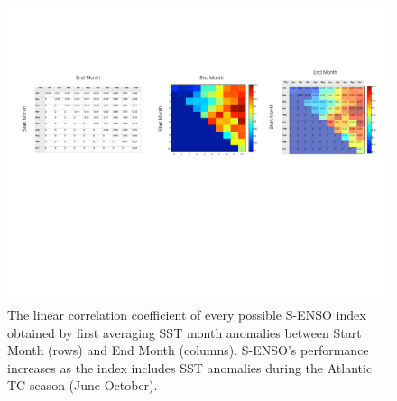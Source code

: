 
\begin{figure}[htbp]
	\centering
		\includegraphics[width=6in]{figures/monthly_cc_matix.pdf}
	\caption{The linear correlation coefficient of every possible S-ENSO index obtained by first averaging SST month anomalies between Start Month (rows) and End Month (columns). S-ENSO's performance increases as the index includes SST anomalies during the Atlantic TC season (June-October).}
	\label{fig:figures_monthly_cc_matix}
\end{figure}





\newpage

